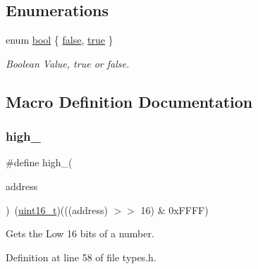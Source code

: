 \subsection*{Enumerations}
\begin{DoxyCompactItemize}
\item 
enum \hyperlink{a00134_af6a258d8f3ee5206d682d799316314b1_af6a258d8f3ee5206d682d799316314b1}{bool} \{ \hyperlink{a00134_af6a258d8f3ee5206d682d799316314b1_af6a258d8f3ee5206d682d799316314b1ae9de385ef6fe9bf3360d1038396b884c}{false}, 
\hyperlink{a00134_af6a258d8f3ee5206d682d799316314b1_af6a258d8f3ee5206d682d799316314b1a08f175a5505a10b9ed657defeb050e4b}{true}
 \}\begin{DoxyCompactList}\small\item\em Boolean Value, true or false. \end{DoxyCompactList}
\end{DoxyCompactItemize}


\subsection{Macro Definition Documentation}
\mbox{\label{a00134_a0a63db19c3e2153ed419aeccf4e33c92_a0a63db19c3e2153ed419aeccf4e33c92}} 
\subsubsection{\texorpdfstring{high\+\_}{high\_16}}
{\footnotesize\ttfamily \#define high\+\_(\begin{DoxyParamCaption}\item[{}]{address }\end{DoxyParamCaption})~(\hyperlink{a00134_a273cf69d639a59973b6019625df33e30_a273cf69d639a59973b6019625df33e30}{uint16\+\_\+t})(((address) $>$$>$ 16) \& 0x\+F\+F\+F\+F)}



Gets the Low 16 bits of a number. 



Definition at line 58 of file types.\+h.

\mbox{\label{a00134_aded7ad58a4bedfffea10d5ae9c0c817e_aded7ad58a4bedfffea10d5ae9c0c817e}} 

